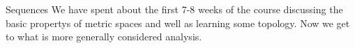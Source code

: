 \begin{chapter}{Sequences}
    We have spent about the first 7-8 weeks of the course discussing the basic propertys of metric spaces and well as learning some topology. Now we get to what is more generally considered analysis. 

\end{chapter}
